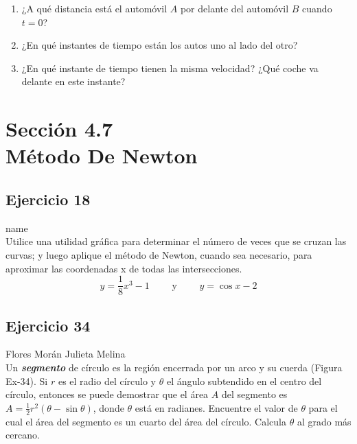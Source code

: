 \documentclass[12pt]{article}
\begin{document}
\begin{enumerate}[label=(\alph*)]
\item ¿A qué distancia está el automóvil $A$ por delante del automóvil $B$ cuando $t = 0$?
\item ¿En qué instantes de tiempo están los autos uno al lado del otro?
\item ¿En qué instante de tiempo tienen la misma velocidad? ¿Qué coche va delante en este instante?
\end{enumerate}

\section{Sección 4.7 \\ Método De Newton}
\subsection{Ejercicio 18} name \\

Utilice una utilidad gráfica para determinar el número de veces que se cruzan las curvas; y luego aplique el método de Newton, cuando sea necesario, para aproximar las coordenadas x de todas las intersecciones.
\[
y=\frac{1}{8}x^3-1 \qquad \text{ y } \qquad y=\cos{x}-2
\]

\subsection{Ejercicio 34} Flores Morán Julieta Melina \\

Un \textit{\textbf{segmento}} de círculo es la región encerrada por un arco y su cuerda (Figura Ex-34). Si $r$ es el radio del círculo y $\theta$ el ángulo subtendido en el centro del círculo, entonces se puede demostrar que el área $A$ del segmento es $A = \frac{1}{2} r^2 (\theta - \sin{\theta})$, donde $\theta$ está en radianes. Encuentre el valor de $\theta$ para el cual el área del segmento es un cuarto del área del círculo. Calcula $\theta$ al grado más cercano.
\end{document}
